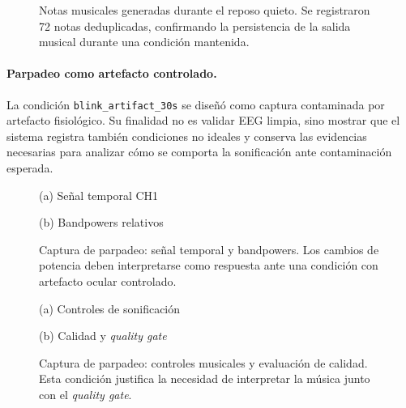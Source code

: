 \begin{figure}[htbp]
    \centering
    \caption{Notas musicales generadas durante el reposo quieto. Se registraron 72 notas deduplicadas, confirmando la persistencia de la salida musical durante una condición mantenida.}
    \label{fig:validacion_s01_03_notes}
\end{figure}

\paragraph{Parpadeo como artefacto controlado.}
La condición \texttt{blink\_artifact\_30s} se diseñó como captura contaminada por artefacto fisiológico. Su finalidad no es validar EEG limpia, sino mostrar que el sistema registra también condiciones no ideales y conserva las evidencias necesarias para analizar cómo se comporta la sonificación ante contaminación esperada.

\begin{figure}[htbp]
    \centering
    \begin{minipage}{0.49\textwidth}
        \centering
        \small (a) Señal temporal CH1
    \end{minipage}
    \hfill
    \begin{minipage}{0.49\textwidth}
        \centering
        \small (b) Bandpowers relativos
    \end{minipage}
    \caption{Captura de parpadeo: señal temporal y bandpowers. Los cambios de potencia deben interpretarse como respuesta ante una condición con artefacto ocular controlado.}
    \label{fig:validacion_s01_04_eeg_bands}
\end{figure}

\begin{figure}[htbp]
    \centering
    \begin{minipage}{0.49\textwidth}
        \centering
        \small (a) Controles de sonificación
    \end{minipage}
    \hfill
    \begin{minipage}{0.49\textwidth}
        \centering
        \small (b) Calidad y \textit{quality gate}
    \end{minipage}
    \caption{Captura de parpadeo: controles musicales y evaluación de calidad. Esta condición justifica la necesidad de interpretar la música junto con el \textit{quality gate}.}
    \label{fig:validacion_s01_04_controls_quality}
\end{figure}

